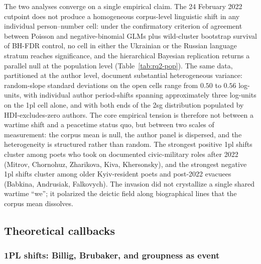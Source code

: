 \documentclass[12pt]{interact}
\theoremstyle{plain}%
\theoremstyle{definition}
\theoremstyle{remark}
\begin{document}
The two analyses converge on a single empirical claim. The 24 February 2022 cutpoint does not produce a homogeneous corpus-level linguistic shift in any individual person--number cell: under the confirmatory criterion of agreement between Poisson and negative-binomial GLMs plus wild-cluster bootstrap survival of BH-FDR control, no cell in either the Ukrainian or the Russian language stratum reaches significance, and the hierarchical Bayesian replication returns a parallel null at the population level (Table~\ref{tab:rq2-pop}). The same data, partitioned at the author level, document substantial heterogeneous variance: random-slope standard deviations on the open cells range from $0.50$ to $0.56$ log-units, with individual author period-shifts spanning approximately three log-units on the 1pl cell alone, and with both ends of the 2sg distribution populated by HDI-excludes-zero authors. The core empirical tension is therefore not between a wartime shift and a peacetime status quo, but between two scales of measurement: the corpus mean is null, the author panel is dispersed, and the heterogeneity is structured rather than random. The strongest positive 1pl shifts cluster among poets who took on documented civic-military roles after 2022 (Mitrov, Chornohuz, Zharikova, Kiva, Khersonsky), and the strongest negative 1pl shifts cluster among older Kyiv-resident poets and post-2022 evacuees (Babkina, Andrusiak, Falkovych). The invasion did not crystallize a single shared wartime ``we''; it polarized the deictic field along biographical lines that the corpus mean dissolves.

\subsection{Theoretical callbacks}
\label{sec:discussion-theory}

\subsubsection{1PL shifts: Billig, Brubaker, and groupness as event}
\end{document}
